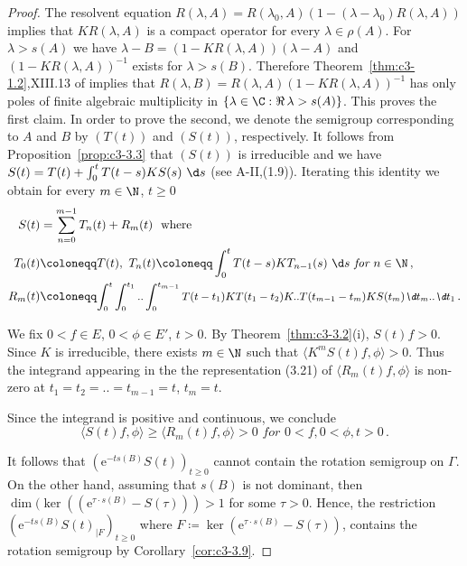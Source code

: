\begin{proof}
	The resolvent equation $R(\lambda,A) = R(\lambda_{0},A)(1 - (\lambda-\lambda_{0})R(\lambda,A))$ implies that $KR(\lambda,A)$ is a compact operator for every $\lambda \in \rho(A)$. 
	For $\lambda > s(A)$ we have $\lambda - B = (1 - KR(\lambda,A))(\lambda-A)$ and $(1 - KR(\lambda,A))^{-1}$ exists for $\lambda > s(B)$.
	Therefore Theorem~\ref{thm:c3-1.2},XIII.13 of \citet{reedsimon:1979} 
	implies that $R(\lambda,B) = R(\lambda,A)(1 - KR(\lambda,A))^{-1}$ has only poles of finite algebraic multiplicity in $\{\lambda \in \C  : \Re\,\lambda > s(A)\}$. 
	This proves the first claim. 
	In order to prove the second, we denote the semigroup corresponding to $A$ and $B$ by $(T(t))$ and $(S(t))$,  respectively.
	It follows from Proposition~\ref{prop:c3-3.3} that $(S(t))$ is irreducible and we have $S(t) = T(t) + \int_{0}^{t} T(t-s)KS(s)~\d s$ (see A-II,(1.9)). 
	Iterating this identity we obtain for every $m \in \N$, $t \geq 0$
	\begin{equation}\label{eq:c3-3.21}
		\begin{aligned}
		S(t) &= \sum_{n=0}^{m-1} T_{n}(t) + R_{m}(t) \ \text{ where}\\
		T_{0}(t)&\coloneqq T(t),\  T_{n}(t) \coloneqq  \int_{0}^{t} T(t-s)KT_{n-1}(s)~\d s \textit{ for } n \in \N\,,\\
		R_{m}(t) &\coloneqq \textit{\small $\int_{0}^{t}\int_{0}^{t_{1}} .. \int_{0}^{t_{m-1}} T(t-t_{1})KT(t_{1}-t_{2})K .. T(t_{m-1}-t_m)KS(t_{m})\d t _{m}..\d t _{1}$}\,.
		\end{aligned}
	\end{equation} 
	
	We fix $0 < f \in E$, $0 < \phi \in E'$, $t > 0$. 
	By Theorem~\ref{thm:c3-3.2}(i), $S(t)f > 0$.
	Since $K$ is irreducible, there exists $m \in \N$ such that $\langle K^{m}S(t)f,\phi\rangle > 0$. 
	Thus the integrand appearing in the the representation (3.21) of $\langle R_{m}(t)f,\phi\rangle$ is non-zero at $t_{1}=t_{2}= .. =t_{m-1}=t$, $t_{m}= t$.
	
	Since the integrand is positive and continuous, we conclude
	\begin{equation}\label{eq:c3-3.22}
		\textit{$\langle S(t)f,\phi\rangle \geq \langle R_{m}(t)f,\phi\rangle > 0$ \ for \ $0 < f, 0 < \phi, t > 0$}\,.
	\end{equation}
	
	It follows that $(\mathrm{e}^{-ts(B)}S(t))_{t \geq 0}$ cannot contain the rotation semigroup on $\Gamma$. 
	On the other hand, assuming that $s(B)$ is not dominant, then $\dim(\ker((\mathrm{e}^{\tau\cdot s(B)} - S(\tau))) > 1$ for some $\tau > 0$. 
	Hence, the restriction $(\mathrm{e}^{-ts(B)}S(t)_{|F})_{t \geq 0}$ where $F \coloneqq  \ker(\mathrm{e}^{\tau\cdot s(B)}- S(\tau))$, contains the rotation semigroup by Corollary~\ref{cor:c3-3.9}.
\end{proof}

